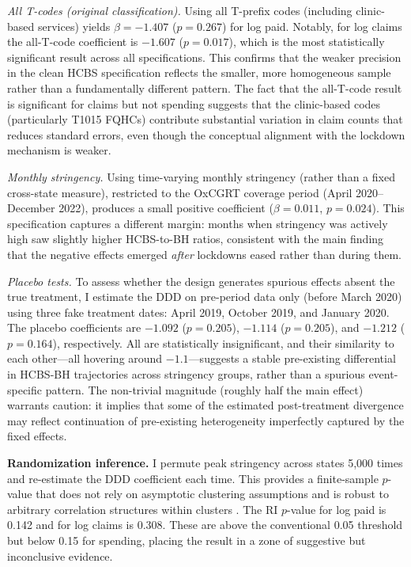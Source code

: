 \documentclass[12pt]{article}
\begin{document}
\textit{All T-codes (original classification).} Using all T-prefix codes (including clinic-based services) yields $\beta = -1.407$ ($p = 0.267$) for log paid. Notably, for log claims the all-T-code coefficient is $-1.607$ ($p = 0.017$), which is the most statistically significant result across all specifications. This confirms that the weaker precision in the clean HCBS specification reflects the smaller, more homogeneous sample rather than a fundamentally different pattern. The fact that the all-T-code result is significant for claims but not spending suggests that the clinic-based codes (particularly T1015 FQHCs) contribute substantial variation in claim counts that reduces standard errors, even though the conceptual alignment with the lockdown mechanism is weaker.

\textit{Monthly stringency.} Using time-varying monthly stringency (rather than a fixed cross-state measure), restricted to the OxCGRT coverage period (April 2020--December 2022), produces a small positive coefficient ($\beta = 0.011$, $p = 0.024$). This specification captures a different margin: months when stringency was actively high saw slightly higher HCBS-to-BH ratios, consistent with the main finding that the negative effects emerged \textit{after} lockdowns eased rather than during them.

\textit{Placebo tests.} To assess whether the design generates spurious effects absent the true treatment, I estimate the DDD on pre-period data only (before March 2020) using three fake treatment dates: April 2019, October 2019, and January 2020. The placebo coefficients are $-1.092$ ($p = 0.205$), $-1.114$ ($p = 0.205$), and $-1.212$ ($p = 0.164$), respectively. All are statistically insignificant, and their similarity to each other---all hovering around $-1.1$---suggests a stable pre-existing differential in HCBS-BH trajectories across stringency groups, rather than a spurious event-specific pattern. The non-trivial magnitude (roughly half the main effect) warrants caution: it implies that some of the estimated post-treatment divergence may reflect continuation of pre-existing heterogeneity imperfectly captured by the fixed effects.

\textbf{Randomization inference.} I permute peak stringency across states 5,000 times and re-estimate the DDD coefficient each time. This provides a finite-sample $p$-value that does not rely on asymptotic clustering assumptions and is robust to arbitrary correlation structures within clusters \citep{rosenbaum2002observational}. The RI $p$-value for log paid is 0.142 and for log claims is 0.308. These are above the conventional 0.05 threshold but below 0.15 for spending, placing the result in a zone of suggestive but inconclusive evidence.
\end{document}
